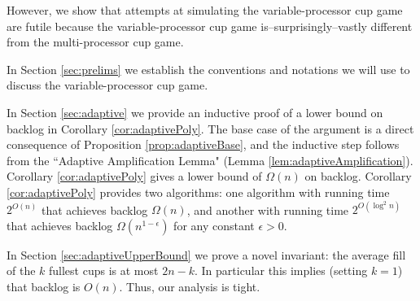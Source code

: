 \documentclass[twocolumn]{article}[10pt]
\renewcommand{\paragraph}[1]{\vspace{0.09in}\noindent{\bf \boldmath #1.}}
\begin{document}
However, we show that attempts at simulating the variable-processor cup
game are futile because the variable-processor cup game
is--surprisingly--vastly different from the multi-processor cup game. 

\paragraph{Outline and Results}
In Section \ref{sec:prelims} we establish the conventions and notations we will
use to discuss the variable-processor cup game. 

In Section \ref{sec:adaptive} we provide an inductive
proof of a lower bound on backlog in Corollary \ref{cor:adaptivePoly}.
The base case of the argument is a direct consequence of Proposition
\ref{prop:adaptiveBase}, and the inductive step follows from the ``Adaptive
Amplification Lemma" (Lemma \ref{lem:adaptiveAmplification}). Corollary
\ref{cor:adaptivePoly} gives a lower bound of $\Omega(n)$ on backlog. Corollary
\ref{cor:adaptivePoly} provides two algorithms: one algorithm with running time
$2^{O(n)}$ that achieves backlog $\Omega(n)$, and another with running time
$2^{O(\log^2 n)}$ that achieves backlog $\Omega(n^{1-\epsilon})$ for any
constant $\epsilon > 0$.

In Section \ref{sec:adaptiveUpperBound} we prove a novel invariant: the average
fill of the $k$ fullest cups is at most $2n-k$. In particular this implies
(setting $k=1$) that backlog is $O(n)$. Thus, our analysis is tight.
\end{document}
